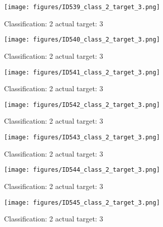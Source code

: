 \begin{figure}[h!]
\begin{center}
\texttt{[image: figures/ID539\_class\_2\_target\_3.png]}
\end{center}
\caption{ Classification: 2 actual target: 3}
\label{fig:ID539_class_2_target_3}
\end{figure}
\begin{figure}[h!]
\begin{center}
\texttt{[image: figures/ID540\_class\_2\_target\_3.png]}
\end{center}
\caption{ Classification: 2 actual target: 3}
\label{fig:ID540_class_2_target_3}
\end{figure}
\begin{figure}[h!]
\begin{center}
\texttt{[image: figures/ID541\_class\_2\_target\_3.png]}
\end{center}
\caption{ Classification: 2 actual target: 3}
\label{fig:ID541_class_2_target_3}
\end{figure}
\begin{figure}[h!]
\begin{center}
\texttt{[image: figures/ID542\_class\_2\_target\_3.png]}
\end{center}
\caption{ Classification: 2 actual target: 3}
\label{fig:ID542_class_2_target_3}
\end{figure}
\begin{figure}[h!]
\begin{center}
\texttt{[image: figures/ID543\_class\_2\_target\_3.png]}
\end{center}
\caption{ Classification: 2 actual target: 3}
\label{fig:ID543_class_2_target_3}
\end{figure}
\begin{figure}[h!]
\begin{center}
\texttt{[image: figures/ID544\_class\_2\_target\_3.png]}
\end{center}
\caption{ Classification: 2 actual target: 3}
\label{fig:ID544_class_2_target_3}
\end{figure}
\begin{figure}[h!]
\begin{center}
\texttt{[image: figures/ID545\_class\_2\_target\_3.png]}
\end{center}
\caption{ Classification: 2 actual target: 3}
\label{fig:ID545_class_2_target_3}
\end{figure}
